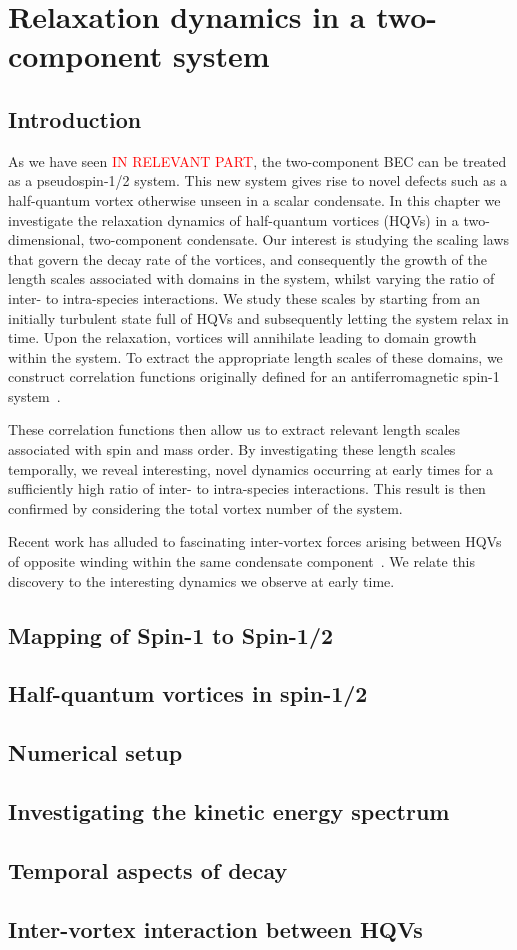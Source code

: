\chapter{Relaxation dynamics in a two-component system}

\section{Introduction}
As we have seen \textcolor{red}{IN RELEVANT PART}, the two-component BEC can be 
treated as a pseudospin-1/2 system. 
This new system gives rise to novel defects such as a half-quantum vortex 
otherwise unseen in a scalar condensate. 
In this chapter we investigate the relaxation dynamics of half-quantum vortices 
(HQVs) in a two-dimensional, two-component condensate. 
Our interest is studying the scaling laws that govern the decay rate of the 
vortices, and consequently the growth of the length scales associated with 
domains in the system, whilst varying the ratio of inter- to intra-species 
interactions. 
We study these scales by starting from an initially turbulent state full of 
HQVs and subsequently letting the system relax in time. 
Upon the relaxation, vortices will annihilate leading to domain growth within 
the system.
To extract the appropriate length scales of these domains, we construct 
correlation functions originally defined for an antiferromagnetic spin-1 
system~\cite{Symes2017}.

These correlation functions then allow us to extract relevant length scales 
associated with spin and mass order. 
By investigating these length scales temporally, we reveal interesting, 
novel dynamics occurring at early times for a sufficiently high ratio of 
inter- to intra-species interactions. 
This result is then confirmed by considering the total vortex number of the 
system. 
\par
Recent work has alluded to fascinating inter-vortex forces arising between HQVs 
of opposite winding within the same condensate 
component~\cite{Eto2011,Kasamatsu2016}.
We relate this discovery to the interesting 
dynamics we observe at early time.

\section{Mapping of Spin-1 to Spin-1/2}

\section{Half-quantum vortices in spin-1/2}

\section{Numerical setup}

\section{Investigating the kinetic energy spectrum}

\section{Temporal aspects of decay}

\section{Inter-vortex interaction between HQVs}
